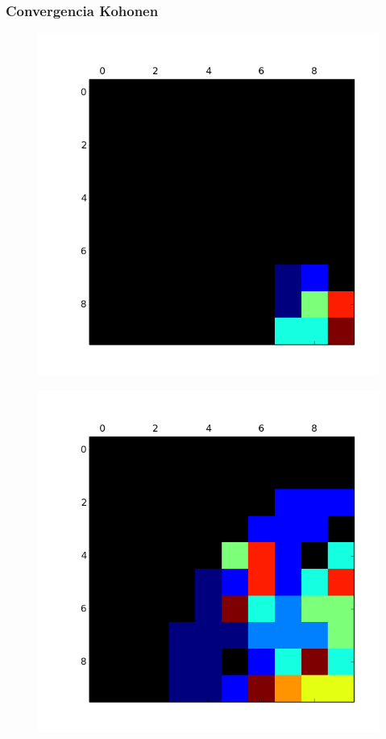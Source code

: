 \subsubsection{Convergencia Kohonen}

\begin{figure}[h!]
\centering
\begin{minipage}{.15\textwidth}
  \centering
  \includegraphics[width=.9\linewidth]{img/convergencia_kohonen/entrenamiento_0.png}
  \label{fig:test1}
\end{minipage}%
\begin{minipage}{.15\textwidth}
  \centering
  \includegraphics[width=.9\linewidth]{img/convergencia_kohonen/entrenamiento_25.png}

\end{minipage}
\end{figure}

